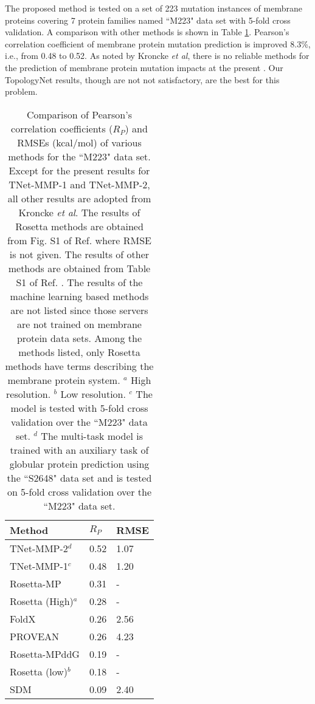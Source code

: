 \documentclass[10pt]{article}
\newcommand\MemMTLPCCMedian{0.52} %
\newcommand\MemMTLRMSEMedian{1.07}
\newcommand\MemSinglePCCMedian{0.48} %
\newcommand\MemSingleRMSEMedian{1.20}
\begin{document}
The proposed method is tested on a set of 223 mutation instances of membrane proteins covering 7 protein families named ``M223" data set   \cite{Kroncke:2016} with 5-fold cross validation. A comparison with other methods is shown in Table \ref{tab:MemMutationPerformance}. 
Pearson's correlation coefficient of membrane protein mutation prediction is improved 8.3\%, i.e., from 0.48 to 0.52. 
As noted by Kroncke {\it et al}, there is no reliable methods for the prediction of  membrane protein mutation impacts at the present \cite{Kroncke:2016}. Our TopologyNet results, though are not not satisfactory, are the best for this problem. 

\begin{table}[ht]
\centering
{}
\begin{tabular}{lll}
\toprule
\rowcolor{gray!75}
Method & $R_P$ & RMSE\\
\midrule
TNet-MMP-2$^d$ & \MemMTLPCCMedian & \MemMTLRMSEMedian\\
TNet-MMP-1$^c$ & \MemSinglePCCMedian & \MemSingleRMSEMedian\\
Rosetta-MP         & 0.31 & - \\
Rosetta (High)$^a$ & 0.28 & - \\
FoldX              & 0.26 & 2.56 \\
PROVEAN            & 0.26 & 4.23 \\
Rosetta-MPddG      & 0.19 & - \\
Rosetta (low)$^b$  & 0.18 & - \\
SDM                & 0.09 & 2.40 \\
\bottomrule
\end{tabular}
\caption{Comparison of  Pearson's correlation coefficients ($R_P$) and RMSEs (kcal/mol) of various methods for the ``M223" data set. Except for the present results for TNet-MMP-1 and TNet-MMP-2, all other results are adopted from Kroncke \emph{et al}\cite{Kroncke:2016}. The results of Rosetta methods are obtained from Fig. S1 of Ref. \cite{Kroncke:2016} where RMSE is not given. The results of other methods are obtained from Table S1 of Ref. \cite{Kroncke:2016}. The results of the machine learning based methods are not listed since those servers are not trained on membrane protein data sets. Among the methods listed, only Rosetta methods have terms describing the membrane protein system. $^a$ High resolution. $^b$ Low resolution. $^c$ The model is tested with 5-fold cross validation over the ``M223" data set. $^d$ The multi-task model is trained with an auxiliary task of globular protein prediction using the ``S2648" data set and is tested on 5-fold cross validation over the ``M223" data set.}
\label{tab:MemMutationPerformance}
\end{table}
\end{document}
